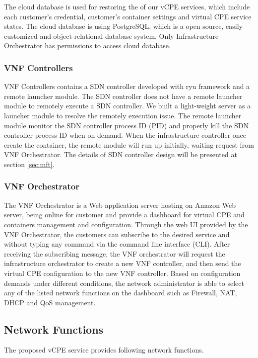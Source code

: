 \documentclass[journal]{IEEEtran}
\begin{document}
The cloud database is used for restoring the of our vCPE services, which include each customer’s credential, customer’s container settings and virtual CPE service states. The cloud database is using PostgreSQL, which is a open source, easily customized and object-relational database system. Only Infrastructure Orchestrator has permissions to access cloud database.

\subsubsection{VNF Controllers}

VNF Controllers contains a SDN controller developed with ryu framework and a remote launcher module. The SDN controller does not have a remote launcher module to remotely execute a SDN controller. We built a light-weight server as a launcher module to resolve the remotely execution issue. The remote launcher module monitor the SDN controller process ID (PID) and properly kill the SDN controller process ID when on demand. When the infrastructure controller once create the container, the remote module will run up initially, waiting request from VNF Orchestrator. The details of SDN controller design will be presented at section \ref{sec:mft}.

\subsubsection{VNF Orchestrator}

The VNF Orchestrator is a Web application server hosting on Amazon Web server, being online for customer and provide a dashboard for virtual CPE and containers management and configuration.
Through the web UI provided by the VNF Orchestrator, the customers can subscribe to the desired service and without typing any command via the command line interface (CLI). After receiving the subscribing message, the VNF orchestrator will request the infrastructure orchestrator to create a new VNF controller, and then send the virtual CPE configuration to the new VNF controller. Based on configuration demands under different conditions, the network administrator is able to select any of the listed network functions on the dashboard such as Firewall, NAT, DHCP and QoS management.



\subsection{Network Functions}
The proposed vCPE service provides following network functions.
\end{document}
